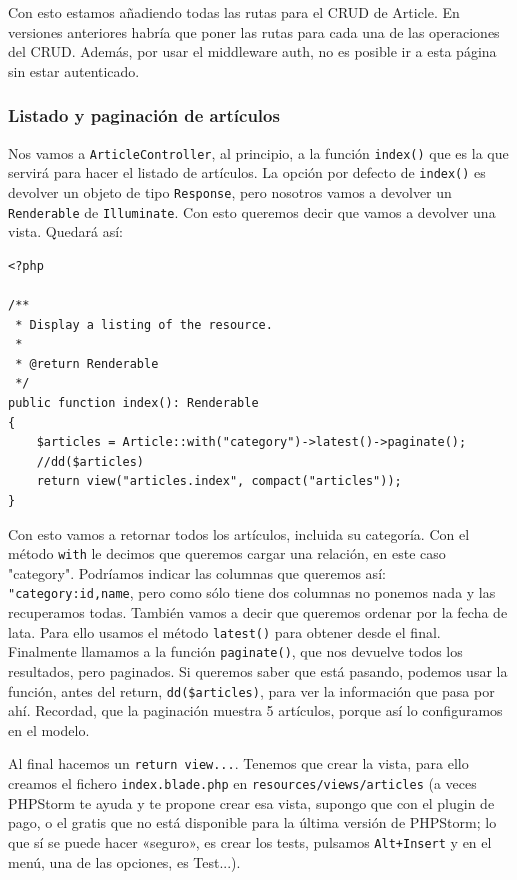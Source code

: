 \documentclass[11pt]{article}
\begin{document}
Con esto estamos añadiendo todas las rutas para el CRUD de Article. En
versiones anteriores habría que poner las rutas para cada una de las
operaciones del CRUD. Además, por usar el middleware auth, no es
posible ir a esta página sin estar autenticado.

\subsubsection{Listado y paginación de artículos}
\label{sec:org4e6fdad}
Nos vamos a \texttt{ArticleController}, al principio, a la función \texttt{index()}
que es la que servirá para hacer el listado de artículos. La opción
por defecto de \texttt{index()} es devolver un objeto de tipo \texttt{Response}, pero
nosotros vamos a devolver un \texttt{Renderable} de \texttt{Illuminate}. Con esto
queremos decir que vamos a devolver una vista. Quedará así:
\begin{verbatim}
<?php

/**
 * Display a listing of the resource.
 *
 * @return Renderable
 */
public function index(): Renderable
{
    $articles = Article::with("category")->latest()->paginate();
    //dd($articles)
    return view("articles.index", compact("articles"));
}
\end{verbatim}
Con esto vamos a retornar todos los artículos, incluida su
categoría. Con el método \texttt{with} le decimos que queremos cargar una
relación, en este caso "category". Podríamos indicar las columnas que
queremos así: \texttt{"category:id,name}, pero como sólo tiene dos columnas
no ponemos nada y las recuperamos todas. También vamos a decir que
queremos ordenar por la fecha de lata. Para ello usamos el método
\texttt{latest()} para obtener desde el final. Finalmente llamamos a la
función \texttt{paginate()}, que nos devuelve todos los resultados, pero
paginados. Si queremos saber que está pasando, podemos usar la
función, antes del return, \texttt{dd(\$articles)}, para ver la información
que pasa por ahí. Recordad, que la paginación muestra 5 artículos,
porque así lo configuramos en el modelo.

Al final hacemos un \texttt{return view...}. Tenemos que crear la vista, para
ello creamos el fichero \texttt{index.blade.php} en
\texttt{resources/views/articles} (a veces PHPStorm te ayuda y te propone
crear esa vista, supongo que con el plugin de pago, o el gratis que no
está disponible para la última versión de PHPStorm; lo que sí se puede
hacer «seguro», es crear los tests, pulsamos \texttt{Alt+Insert} y en el
menú, una de las opciones, es Test...).
\end{document}
